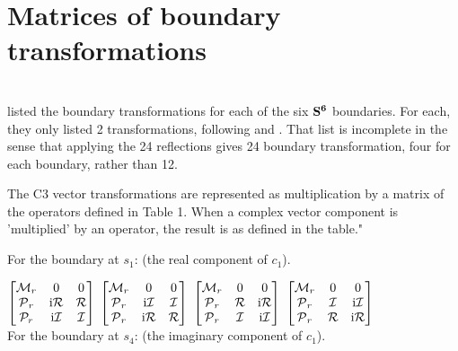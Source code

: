 \documentclass[preprint]{iucr}              %
\numberwithin{equation}{section}
\newcommand{\SVI}[0]{$\bf{S^{6}}$}
\newcommand{\Imaginary}[0]{\mathcal{I}}
\newcommand{\Real}[0]{\mathcal{R}}
\begin{document}
	\section{Matrices of boundary transformations}
	~~\\
	
	
	
	 listed the boundary transformations
	for each of the six \SVI{} boundaries. For each,
	they only listed 2 transformations, following 
	and . That list is incomplete in the sense
	that applying the 24 reflections gives 24 boundary transformation,
	four for each boundary, rather than 12.
	
	The C3 vector transformations are represented as multiplication by a matrix of the operators defined in Table 1. When a complex vector component is 'multiplied' by an operator, the result is as defined in the table."
		
	
	For the boundary at $s_1$: (the real component of $c_1$).
	
	$\begin{bmatrix}
		\Minus{}_r		& 0					& 0 \\
		\Plus{}_r		&  \textrm{i}\Real{}	& \Real{} \\
		\mathcal{P}_r	& \textrm{i}\Imaginary{}	& \Imaginary{}
	\end{bmatrix}$
	$\begin{bmatrix}
		\Minus{}_r	& 0 				& 0 \\
		\Plus{}_r	&\textrm{i}\Imaginary{}	& \Imaginary{} \\
		\Plus{}_r	& \textrm{i}\Real{}	& \Real{} \\
	\end{bmatrix}$ 
	$\begin{bmatrix}
		\label{thirdmatrix}
		\Minus{}_r	& 0			& 0 \\
		\Plus{}_r	&  \Real{}	& \textrm{i}\Real{} \\
		\Plus{}_r	& \Imaginary{}		&\textrm{i}\Imaginary{}
	\end{bmatrix}	$
	$\begin{bmatrix}
		\Minus{}_r	& 0			& 0 \\
		\Plus{}_r	& \Imaginary{}		&\textrm{i}\Imaginary{} \\
		\Plus{}_r	&  \Real{}	&\textrm{i}\Real{} \\
	\end{bmatrix}$ \\
	
	For the boundary at $s_4$: (the imaginary component of $c_1$).
	
\end{document}
